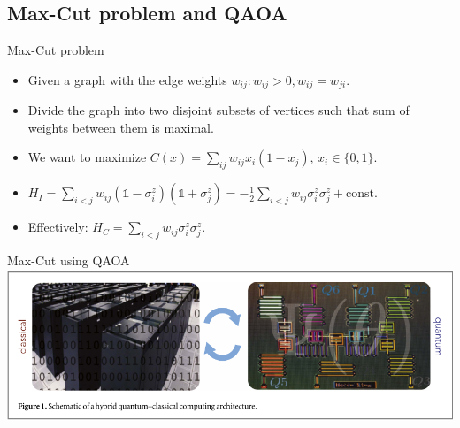 \subsection{Max-Cut problem and QAOA}
\begin{frame}{Max-Cut problem}
    \begin{block}{}
    \begin{itemize}
        \item Given a graph with the edge weights $w_{ij}: w_{ij}>0, w_{ij}=w_{ji}$.
        \item Divide the graph into two disjoint subsets of vertices
        such that sum of weights between them is maximal.
        \item We want to maximize $C(x) = \sum_{ij} w_{ij} x_i(1-x_j)$, $x_i \in \{0,1\}$.
        \item $H_I=\sum_{i<j}w_{ij}(\mathbb{1}-\sigma_i^z)(\mathbb{1}+\sigma_j^z) = - \frac{1}{2} \sum_{i<j} w_{ij}\sigma_i^z\sigma_j^z+\text{const.}$
        \item Effectively: $H_C= \sum_{i<j} w_{ij}\sigma_i^z\sigma_j^z$.
    \end{itemize}
    \end{block}
\end{frame}
\endgroup
\begin{frame}{Max-Cut using QAOA}
    \centering
    \includegraphics[page=5, width=\textwidth]{pics/vqe.pdf}
\end{frame}
